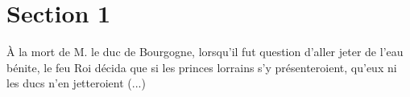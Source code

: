 \documentclass{article}
\begin{document}
\section{Section 1}



\`A la mort de M. le \gls{duc} de Bourgogne, lorsqu'il fut question d'aller jeter de l'eau b\'enite, le feu Roi d\'ecida que si les princes lorrains s'y pr\'esenteroient, qu'eux ni les \gls{ducs} n'en jetteroient (...)



\printglossaries
\end{document}

